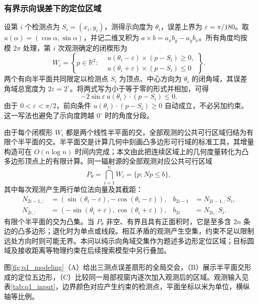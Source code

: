 \documentclass[zihao=-4,a4paper,UTF8,fontset=none]{ctexart}
\begin{document}
\subsubsection{有界示向误差下的定位区域}

设第 $i$ 个检测点为 $S_i=(x_i,y_i)$，测得示向度为 $\theta_i$，误差上界为 $\varepsilon=\pi/180$。取 $u(\alpha)=(\cos\alpha,\sin\alpha)$，并记二维叉积为 $a\times b=a_xb_y-a_yb_x$。所有角度均按模 $2\pi$ 处理，第 $i$ 次观测确定的闭楔形为
\begin{equation}
W_i=\left\{p\in\mathbb R^2:
\begin{aligned}
&u(\theta_i-\varepsilon)\times(p-S_i)\ge0,\\
&u(\theta_i+\varepsilon)\times(p-S_i)\le0
\end{aligned}\right\}.
\label{eq:q1_wedge}
\end{equation}
两个有向半平面共同限定以检测点 $S_i$ 为顶点、中心方向为 $\theta_i$ 的闭角域，其误差角域总宽度为 $2\varepsilon=2^\circ$。将两式写为小于等于零的形式并相加，可得
\[
-2\sin\varepsilon\,u(\theta_i)\cdot(p-S_i)\le0.
\]
由于 $0<\varepsilon<\pi/2$，前向条件 $u(\theta_i)\cdot(p-S_i)\ge0$ 自动成立，不必另加约束。这一写法也避免了示向度跨越 $0^\circ$ 时的角度分段。

由于每个闭楔形 $W_i$ 都是两个线性半平面的交，全部观测的公共可行区域归结为有限个半平面的交。半平面交是计算几何中刻画凸多边形可行域的标准工具，其增量构造可在 $O(n\log n)$ 时间内完成\cite{deberg2008}；本文由此把连续区域上的几何度量转化为凸多边形顶点上的有限计算。同一辐射源的全部观测对应公共可行区域
\begin{equation}
P_\theta=\bigcap_{i=1}^{n}W_i=\{p:Np\le b\},
\label{eq:q1_region}
\end{equation}
其中每次观测产生两行单位法向量及其截距：
\[
\begin{aligned}
N_{2i-1,:}&=(\sin(\theta_i-\varepsilon),-\cos(\theta_i-\varepsilon)),
&b_{2i-1}&=N_{2i-1,:}S_i,\\
N_{2i,:}&=(-\sin(\theta_i+\varepsilon),\cos(\theta_i+\varepsilon)),
&b_{2i}&=N_{2i,:}S_i.
\end{aligned}
\]
有限个半平面的交为凸集。当 $P_\theta$ 非空、有界且具有正面积时，它是至多含 $2n$ 条边的凸多边形；退化时为单点或线段。相互矛盾的观测产生空集，约束不足以限制远处方向时则可能无界。本问以纯示向角域交集作为题述多边形定位区域；目标圆域及接收距离等物理约束在后续搜索模型中另行叠加。

图\ref{fig:q1_modeling}（A）给出三测点误差扇形的全局交会，（B）展示半平面交形成的定位五边形，（C）比较同一局部视窗内逐次加入观测后的区域。观测输入见表\ref{tab:q1_input}，边界颜色对应产生约束的检测点，平面坐标以米为单位，横纵轴等比例。
\end{document}
